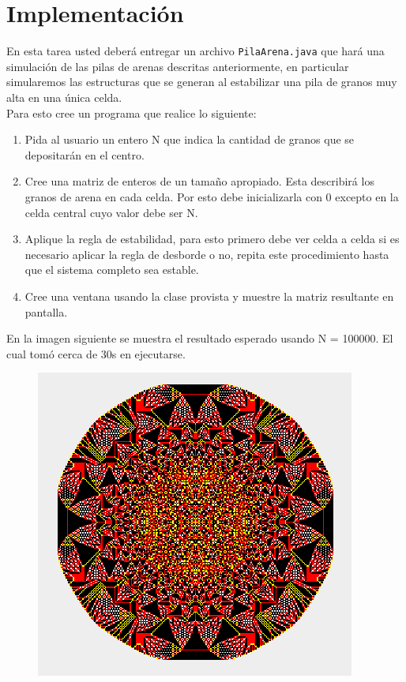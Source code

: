 \documentclass[dcc]{fcfmcourse}
\begin{document}
\newpage
\section{Implementación}
En esta tarea usted deberá entregar un archivo \texttt{PilaArena.java} que hará una simulación de las pilas de arenas descritas anteriormente, en particular simularemos las estructuras que se generan al estabilizar una pila de granos muy alta en una única celda. \\

Para esto cree un programa que realice lo siguiente:

\begin{enumerate}
    \item Pida al usuario un entero N que indica la cantidad de granos que se depositarán en el centro.
    \item Cree una matriz de enteros de un tamaño apropiado. Esta describirá los granos de arena en cada celda. Por esto debe inicializarla con 0 excepto en la celda central cuyo valor debe ser N.
    \item Aplique la regla de estabilidad, para esto primero debe ver celda a celda si es necesario aplicar la regla de desborde o no, repita este procedimiento hasta que el sistema completo sea estable.
    \item Cree una ventana usando la clase provista y muestre la matriz resultante en pantalla.
\end{enumerate}

En la imagen siguiente se muestra el resultado esperado usando N = 100000. El cual tomó cerca de 30s en ejecutarse.

\begin{figure}[!ht]
    \centering
    \includegraphics[scale=0.7]{imagenes/res.png}
\end{figure}
\end{document}
